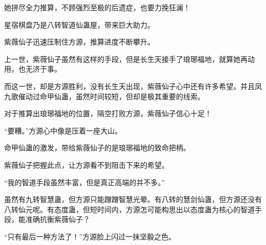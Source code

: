 \begin{this_body}
她拼尽全力推算，不顾强烈至极的后遗症，也要力挽狂澜！

星宿棋盘乃是八转智道仙蛊屋，带来巨大助力。

紫薇仙子迅速压制住方源，推算进度不断攀升。

上一世，紫薇仙子虽然有这样的手段，但是长生天接手了琅琊福地，就算她再动用，也无济于事。

而这一世，却是方源胜利，没有长生天出现，紫薇仙子心中还有许多希望。并且凤九歌催动过命甲仙蛊，虽然时间较短，但却是极其重要的线索。

对于推算出琅琊福地的位置，隔空打败方源，紫薇仙子信心十足！

“要糟。”方源心中像是压着一座大山。

命甲仙蛊的激发，带给紫薇仙子的是琅琊福地的致命把柄。

紫薇仙子把握此点，让方源看不到阻击下来的希望。

“我的智道手段虽然丰富，但是真正高端的并不多。”

虽然有九转智慧蛊，但方源只能蹭蹭智慧光晕。有八转的慧剑仙蛊，但方源还没有八转仙元呢。有态度蛊，但短时间内，方源怎可能构思出以态度蛊为核心的智道手段，能准确抗衡紫薇仙子？

“只有最后一种方法了！”方源脸上闪过一抹坚毅之色。

\end{this_body}

